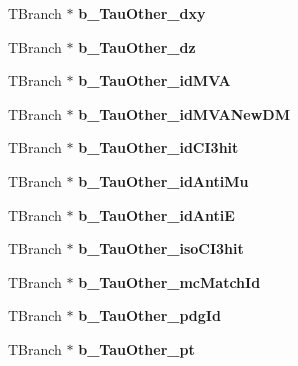 \begin{DoxyCompactItemize}
\item 
\hypertarget{classMiniTree_accae62340e30f4eb108a267852a11326}{}\label{classMiniTree_accae62340e30f4eb108a267852a11326} 
T\+Branch $\ast$ {\bfseries b\+\_\+\+Tau\+Other\+\_\+dxy}
\item 
\hypertarget{classMiniTree_aa8f2fa84f4224e4dce78e65ed6527d07}{}\label{classMiniTree_aa8f2fa84f4224e4dce78e65ed6527d07} 
T\+Branch $\ast$ {\bfseries b\+\_\+\+Tau\+Other\+\_\+dz}
\item 
\hypertarget{classMiniTree_a49a0b6caca1eab7a01fda447da91a39a}{}\label{classMiniTree_a49a0b6caca1eab7a01fda447da91a39a} 
T\+Branch $\ast$ {\bfseries b\+\_\+\+Tau\+Other\+\_\+id\+M\+VA}
\item 
\hypertarget{classMiniTree_a52dc093e2ed2819e01d60ee132e2bb6d}{}\label{classMiniTree_a52dc093e2ed2819e01d60ee132e2bb6d} 
T\+Branch $\ast$ {\bfseries b\+\_\+\+Tau\+Other\+\_\+id\+M\+V\+A\+New\+DM}
\item 
\hypertarget{classMiniTree_a1635e49def78a3e5d8f7480d1ae72d86}{}\label{classMiniTree_a1635e49def78a3e5d8f7480d1ae72d86} 
T\+Branch $\ast$ {\bfseries b\+\_\+\+Tau\+Other\+\_\+id\+C\+I3hit}
\item 
\hypertarget{classMiniTree_add747123cfdc788ca9c62eabadbc4d3f}{}\label{classMiniTree_add747123cfdc788ca9c62eabadbc4d3f} 
T\+Branch $\ast$ {\bfseries b\+\_\+\+Tau\+Other\+\_\+id\+Anti\+Mu}
\item 
\hypertarget{classMiniTree_a6f9f55c956c442a6907586b051dce487}{}\label{classMiniTree_a6f9f55c956c442a6907586b051dce487} 
T\+Branch $\ast$ {\bfseries b\+\_\+\+Tau\+Other\+\_\+id\+AntiE}
\item 
\hypertarget{classMiniTree_a655e252f07dd33fffc8b78388e137156}{}\label{classMiniTree_a655e252f07dd33fffc8b78388e137156} 
T\+Branch $\ast$ {\bfseries b\+\_\+\+Tau\+Other\+\_\+iso\+C\+I3hit}
\item 
\hypertarget{classMiniTree_a15a33cbd574b6fee08f27a6898900b0e}{}\label{classMiniTree_a15a33cbd574b6fee08f27a6898900b0e} 
T\+Branch $\ast$ {\bfseries b\+\_\+\+Tau\+Other\+\_\+mc\+Match\+Id}
\item 
\hypertarget{classMiniTree_a98285abce933ecca1ec1909b345aab3b}{}\label{classMiniTree_a98285abce933ecca1ec1909b345aab3b} 
T\+Branch $\ast$ {\bfseries b\+\_\+\+Tau\+Other\+\_\+pdg\+Id}
\item 
\hypertarget{classMiniTree_a029c34c240f8c76fbe9632d10aca8b2a}{}\label{classMiniTree_a029c34c240f8c76fbe9632d10aca8b2a} 
T\+Branch $\ast$ {\bfseries b\+\_\+\+Tau\+Other\+\_\+pt}
\item 
\hypertarget{classMiniTree_a3562f3aef4938d84ec4d44d3cea28169}{}\label{classMiniTree_a3562f3aef4938d84ec4d44d3cea28169} 

\end{DoxyCompactItemize}
